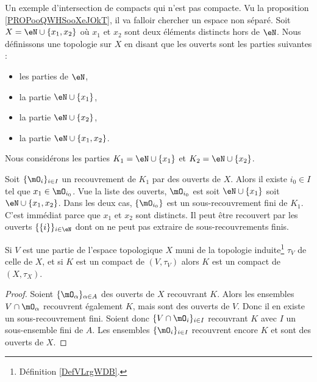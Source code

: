 \begin{example}
	Un exemple d'intersection de compacts qui n'est pas compacte. Vu la proposition \ref{PROPooQWHSooXeJOkT}, il va falloir chercher un espace non séparé. Soit \( X=\eN\cup\{ x_1,x_2 \}\) où \( x_1\) et \( x_2\) sont deux éléments distincts hors de \( \eN\). Nous définissons une topologie sur \( X\) en disant que les ouverts sont les parties suivantes :
	\begin{itemize}
		\item les parties de \( \eN\),
		\item la partie \( \eN\cup\{ x_1 \}\),
		\item la partie \( \eN\cup\{ x_2 \}\),
		\item la partie \( \eN\cup\{ x_1,x_2 \}\).
	\end{itemize}
	Nous considérons les parties \( K_1=\eN\cup\{ x_1 \}\) et \(K_2= \eN\cup \{ x_2 \}\).
	\begin{subproof}
		Soit \( \{ \mO_i \}_{i\in I}\) un recouvrement de \( K_1\) par des ouverts de \( X\). Alors il existe \( i_0\in I\) tel que \( x_1\in\mO_{i_0}\). Vue la liste des ouverts, \( \mO_{i_0}\) est soit \( \eN\cup\{ x_1 \}\) soit \( \eN\cup\{ x_1,x_2 \}\). Dans les deux cas, \( \{ \mO_{i_0} \}\) est un sous-recouvrement fini de \( K_1\).
		\spitem[\( K_1\cap K_2=\eN\)]
		C'est immédiat parce que \( x_1\) et \( x_2\) sont distincts.
		Il peut être recouvert par les ouverts \( \{ \{ i \} \}_{i\in \eN}\) dont on ne peut pas extraire de sous-recouvrements finis.
	\end{subproof}
\end{example}

\begin{proposition}     \label{PropGBZUooRKaOxy}
	Si \( V\) est une partie de l'espace topologique \( X\) muni de la topologie induite\footnote{Définition \ref{DefVLrgWDB}.} \( \tau_V\) de celle de \( X\), et si \( K\) est un compact de \( (V,\tau_V)\) alors \( K\) est un compact de \( (X,\tau_X)\).
\end{proposition}

\begin{proof}
	Soient \( \{ \mO_\alpha \}_{\alpha\in A}  \) des ouverts de \( X\) recouvrant \( K\). Alors les ensembles \( V\cap \mO_{\alpha}\) recouvrent également \( K\), mais sont des ouverts de \( V\). Donc il en existe un sous-recouvrement fini. Soient donc \( \{V\cap\mO_i\}_{i\in I}\) recouvrant \( K\) avec \( I\) un sous-ensemble fini de \( A\). Les ensembles \( \{\mO_i\}_{i\in I}\) recouvrent encore \( K\) et sont des ouverts de \( X\).
\end{proof}

